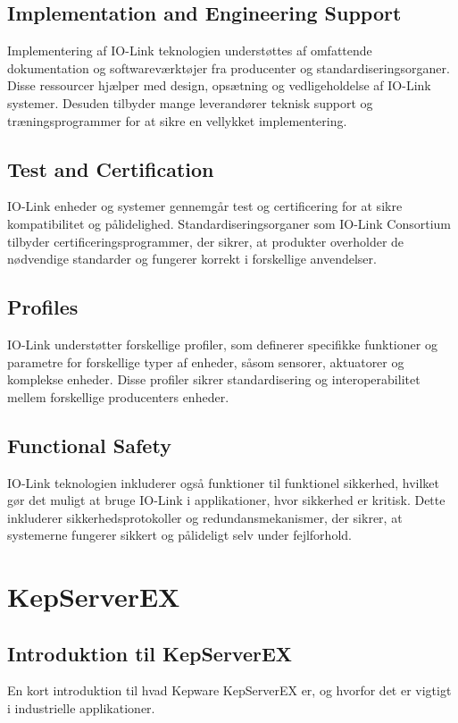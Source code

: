 \subsection{Implementation and Engineering Support}
Implementering af IO-Link teknologien understøttes af omfattende dokumentation og softwareværktøjer fra producenter og standardiseringsorganer. Disse ressourcer hjælper med design, opsætning og vedligeholdelse af IO-Link systemer. Desuden tilbyder mange leverandører teknisk support og træningsprogrammer for at sikre en vellykket implementering.

\subsection{Test and Certification}
IO-Link enheder og systemer gennemgår test og certificering for at sikre kompatibilitet og pålidelighed. Standardiseringsorganer som IO-Link Consortium tilbyder certificeringsprogrammer, der sikrer, at produkter overholder de nødvendige standarder og fungerer korrekt i forskellige anvendelser.

\subsection{Profiles}
IO-Link understøtter forskellige profiler, som definerer specifikke funktioner og parametre for forskellige typer af enheder, såsom sensorer, aktuatorer og komplekse enheder. Disse profiler sikrer standardisering og interoperabilitet mellem forskellige producenters enheder.

\subsection{Functional Safety}
IO-Link teknologien inkluderer også funktioner til funktionel sikkerhed, hvilket gør det muligt at bruge IO-Link i applikationer, hvor sikkerhed er kritisk. Dette inkluderer sikkerhedsprotokoller og redundansmekanismer, der sikrer, at systemerne fungerer sikkert og pålideligt selv under fejlforhold.

\section{KepServerEX}

\subsection{Introduktion til KepServerEX}
En kort introduktion til hvad Kepware KepServerEX er, og hvorfor det er vigtigt i industrielle applikationer.

